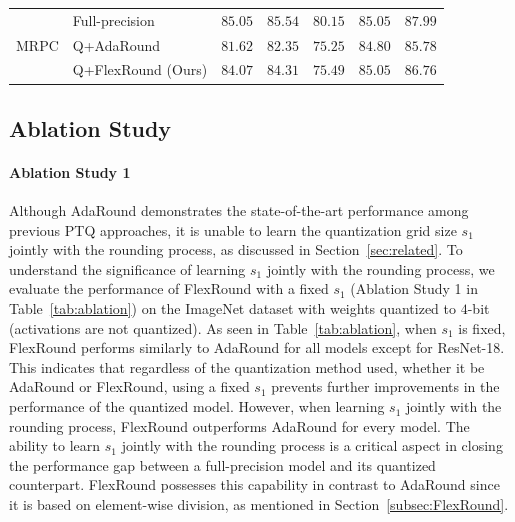 \documentclass{article}
\theoremstyle{plain}
\theoremstyle{definition}
\theoremstyle{remark}
\begin{document}
\begin{table}[t]
\begin{center}
\begin{tabular}{clccccc}
\midrule
& Full-precision & $85.05$ & $85.54$ & $80.15$ & $85.05$ & $87.99$ \\ 
\cmidrule{2-7}
MRPC & Q+AdaRound & $81.62$ & $82.35$ & $75.25$ & $84.80$ &  $85.78$ \\
& Q+FlexRound (Ours)& $\mathbf{84.07}$ & $\mathbf{84.31}$ & $\mathbf{75.49}$ & $\mathbf{85.05}$ & $\mathbf{86.76}$ \\
\bottomrule
\end{tabular}
\end{center}
\vskip -0.15in
\end{table}



\subsection{Ablation Study}\label{subsec:ablation}

\paragraph{Ablation Study 1} Although AdaRound demonstrates the state-of-the-art performance among previous PTQ approaches, it is unable to learn the quantization grid size $s_1$ jointly with the rounding process, as discussed in Section~\ref{sec:related}. To understand the significance of learning $s_1$ jointly with the rounding process, we evaluate the performance of FlexRound with a fixed $s_1$ (Ablation Study 1 in Table~\ref{tab:ablation}) on the ImageNet dataset with weights quantized to $4$-bit (activations are not quantized). As seen in Table~\ref{tab:ablation}, when $s_1$ is fixed, FlexRound performs similarly to AdaRound for all models except for ResNet-18. This indicates that regardless of the quantization method used, whether it be AdaRound or FlexRound, using a fixed $s_1$ prevents further improvements in the performance of the quantized model. However, when learning $s_1$ jointly with the rounding process, FlexRound outperforms AdaRound for every model. The ability to learn $s_1$ jointly with the rounding process is a critical aspect in closing the performance gap between a full-precision model and its quantized counterpart. FlexRound possesses this capability in contrast to AdaRound since it is based on element-wise division, as mentioned in Section~\ref{subsec:FlexRound}.
\end{document}
